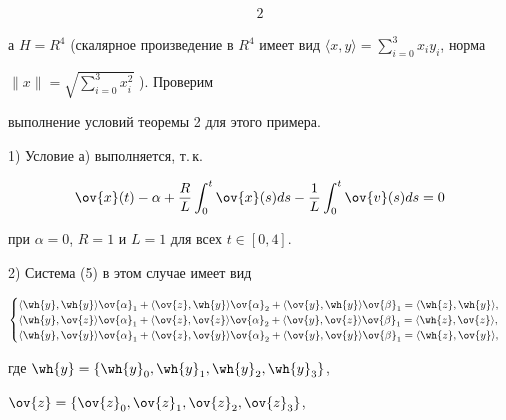 \begin{exam}
\begin{alignat*}{2}
\end{alignat*}


а $H=R^4$ (скалярное произведение в $R^4$ имеет вид $\langle


x,y\rangle=\sum\limits^3_{i=0}x_i y_i$, норма 


$\|x\|=\sqrt{\sum\limits^3_{i=0}x_i^2}$ ). Проверим


выполнение условий теоремы 2 для этого примера.





1) Условие а) выполняется, т.\,к.


$$


\ov{x}(t)-\alpha+\frac{R}{L}\int^t_0\ov{x}(s)ds -


\frac{1}{L}\int^t_0\ov{v}(s)ds=0


$$


при $\alpha=0$, $R=1$ и $L=1$ для всех $t\in[0,4]$.





2) Система (5) в этом случае имеет вид


$$


\begin{cases}


\langle\wh{y},\wh{y}\rangle\ov{\alpha}_1 +


\langle\ov{z},\wh{y}\rangle\ov{\alpha}_2 +


\langle\ov{y},\wh{y}\rangle\ov{\beta}_1


=\langle\wh{z},\wh{y}\rangle, \\


\langle\wh{y},\ov{z}\rangle\ov{\alpha}_1 +


\langle\ov{z},\ov{z}\rangle\ov{\alpha}_2 +


\langle\ov{y},\ov{z}\rangle\ov{\beta}_1


=\langle\wh{z},\ov{z}\rangle,\\


\langle\wh{y},\ov{y}\rangle\ov{\alpha}_1 +


\langle\ov{z},\ov{y}\rangle\ov{\alpha}_2 +


\langle\ov{y},\ov{y}\rangle\ov{\beta}_1


=\langle\wh{z},\ov{y}\rangle,


\end{cases}


$$


где $\wh{y}=\{\wh{y}_0, \wh{y}_1, \wh{y}_2, \wh{y}_3\}$,


$\ov{z}=\{\ov{z}_0, \ov{z}_1, \ov{z}_2, \ov{z}_3\}$,



\end{exam}
